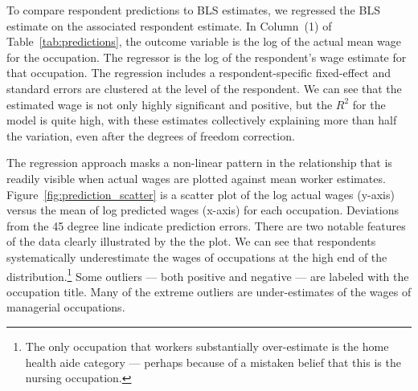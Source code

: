 \documentclass[12pt]{article}
\begin{document}
To compare respondent predictions to BLS estimates, we regressed the BLS estimate on the associated respondent estimate. 
In Column~(1) of Table~\ref{tab:predictions}, the outcome variable is the log of the actual mean wage for the occupation. 
The regressor is the log of the respondent's wage estimate for that occupation. 
The regression includes a respondent-specific fixed-effect and standard errors are clustered at the level of the respondent. 
We can see that the estimated wage is not only highly significant and positive, but the $R^2$ for the model is quite high, with these estimates collectively explaining more than half the variation, even after the degrees of freedom correction. 


The regression approach masks a non-linear pattern in the relationship that is readily visible when actual wages are plotted against mean worker estimates. 
Figure~\ref{fig:prediction_scatter} is a scatter plot of the log actual wages (y-axis) versus the mean of log predicted wages (x-axis) for each occupation. 
Deviations from the 45 degree line indicate prediction errors. 
There are two notable features of the data clearly illustrated by the the plot. 
We can see that respondents systematically underestimate the wages of occupations at the high end of the distribution.\footnote
{
The only occupation that workers substantially over-estimate is the home health aide category --- perhaps because of a mistaken belief that this is the nursing occupation.
}  
Some outliers --- both positive and negative --- are labeled with the occupation title.  
Many of the extreme outliers are under-estimates of the wages of managerial occupations. 
\end{document}
